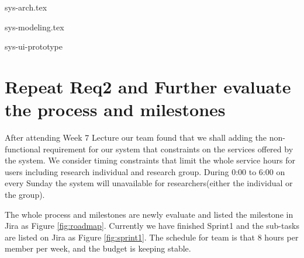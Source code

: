 \documentclass[]{article}
\begin{document}
{sys-arch.tex}

{sys-modeling.tex}

{sys-ui-prototype}

\section{Repeat Req2 and Further evaluate the process and milestones}

After attending Week 7 Lecture our team found that we shall adding the non-functional
requirement for our system that constraints on the services offered by the system.
We consider timing constraints that limit the whole service hours for users including
research individual and research group. During 0:00 to 6:00 on every Sunday the system
will unavailable for researchers(either the individual or the group).





The whole process and milestones are newly evaluate and listed the milestone in Jira as Figure \ref{fig:roadmap}.
Currently we have finished Sprint1 and the sub-tasks are listed on Jira as Figure \ref{fig:sprint1}.
The schedule for team is that 8 hours per member per week, and the budget is keeping stable.
\end{document}
